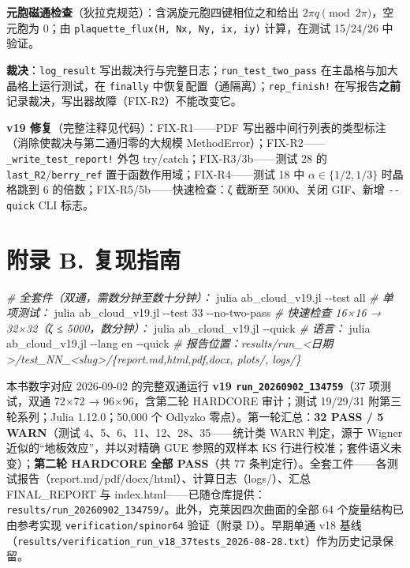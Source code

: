\documentclass[
]{article}
\newenvironment{Shaded}{}{}
\newcommand{\AttributeTok}[1]{\textcolor[rgb]{0.49,0.56,0.16}{#1}}
\newcommand{\CommentTok}[1]{\textcolor[rgb]{0.38,0.63,0.69}{\textit{#1}}}
\newcommand{\ExtensionTok}[1]{#1}
\newcommand{\NormalTok}[1]{#1}
\begin{document}
\textbf{元胞磁通检查}（狄拉克规范）：含涡旋元胞四键相位之和给出
\(2\pi q \pmod{2\pi}\)，空元胞为 0；由
\texttt{plaquette\_flux(H,\ Nx,\ Ny,\ ix,\ iy)} 计算，在测试 15/24/26
中验证。

\textbf{裁决}：\texttt{log\_result}
写出裁决行与完整日志；\texttt{run\_test\_two\_pass}
在主晶格与加大晶格上运行测试，在 \texttt{finally}
中恢复配置（通隔离）；\texttt{rep\_finish!}
在写报告\textbf{之前}记录裁决，写出器故障（FIX-R2）不能改变它。

\textbf{v19 修复}（完整注释见代码）：FIX-R1------PDF
写出器中间行列表的类型标注（消除使裁决与第二通归零的大规模
MethodError）；FIX-R2------\texttt{\_write\_test\_report!} 外包
try/catch；FIX-R3/3b------测试 28 的
\texttt{last\_R2}/\texttt{berry\_ref} 置于函数作用域；FIX-R4------测试
18 中 \(\alpha\in\{1/2,1/3\}\) 时晶格跳到 6
的倍数；FIX-R5/5b------快速检查：ζ 截断至 5000、关闭 GIF、新增
\texttt{-\/-quick} CLI 标志。

\section{附录 B.
复现指南}\label{ux9644ux5f55-b.-ux590dux73b0ux6307ux5357}

\begin{Shaded}
\begin{Highlighting}[]
\CommentTok{\# 全套件（双通，需数分钟至数十分钟）：}
\ExtensionTok{julia}\NormalTok{ ab\_cloud\_v19.jl }\AttributeTok{{-}{-}test}\NormalTok{ all}
\CommentTok{\# 单项测试：}
\ExtensionTok{julia}\NormalTok{ ab\_cloud\_v19.jl }\AttributeTok{{-}{-}test}\NormalTok{ 33 }\AttributeTok{{-}{-}no{-}two{-}pass}
\CommentTok{\# 快速检查 16×16 → 32×32（ζ ≤ 5000，数分钟）：}
\ExtensionTok{julia}\NormalTok{ ab\_cloud\_v19.jl }\AttributeTok{{-}{-}quick}
\CommentTok{\# 语言：}
\ExtensionTok{julia}\NormalTok{ ab\_cloud\_v19.jl }\AttributeTok{{-}{-}lang}\NormalTok{ en }\AttributeTok{{-}{-}quick}
\CommentTok{\# 报告位置：results/run\_\textless{}日期\textgreater{}/test\_NN\_\textless{}slug\textgreater{}/\{report.md,html,pdf,docx, plots/, logs/\}}
\end{Highlighting}
\end{Shaded}

本书数字对应 2026-09-02 的完整双通运行 \textbf{v19
\texttt{run\_20260902\_134759}}（37 项测试，双通 72×72 → 96×96，含第二轮
HARDCORE 审计；测试 19/29/31 附第三轮系列；Julia 1.12.0；50,000 个
Odlyzko 零点）。第一轮汇总：\textbf{32 PASS / 5 WARN}（测试
4、5、6、11、12、28、35------统计类 WARN 判定，源于 Wigner
近似的``地板效应''，并以对精确 GUE 参照的双样本 KS
行进行校准；套件语义未变）；\textbf{第二轮 HARDCORE 全部 PASS}（共 77
条判定行）。全套工件------各测试报告（report.md/pdf/docx/html）、计算日志（logs/）、汇总
FINAL\_REPORT 与
index.html------已随仓库提供：\texttt{results/run\_20260902\_134759/}。此外，克莱因四次曲面的全部
64 个旋量结构已由参考实现 \texttt{verification/spinor64} 验证（附录
D）。早期单通 v18
基线（\texttt{results/verification\_run\_v18\_37tests\_2026-08-28.txt}）作为历史记录保留。
\end{document}
